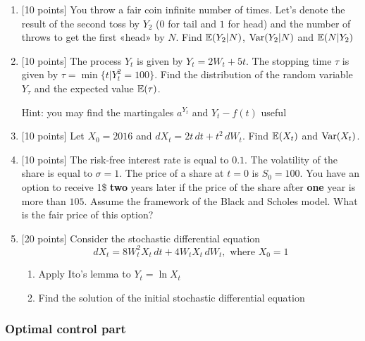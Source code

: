 \documentclass[12pt, a4paper]{article}
\begin{document}
\vspace{10pt}

\begin{enumerate}


\item $[$10 points] You throw a fair coin infinite number of times. Let's denote the result of the second toss by $Y_2$ ($0$ for tail and $1$ for head) and the number of throws to get the first «head» by $N$. Find $\mathbb{E}(Y_2|N)$, $\operatorname{Var}(Y_2|N)$ and $\mathbb{E}(N|Y_2)$

\item $[$10 points] The process $Y_t$ is given by $Y_t=2W_t+5t$. The stopping time $\tau$ is given by $\tau=\min\{t|Y_t^2=100\}$. Find the distribution of the random variable $Y_\tau$ and the expected value $\mathbb{E}(\tau)$.


Hint: you may find the martingales $a^{Y_t}$ and $Y_t-f(t)$ useful

\item $[$10 points] Let $X_0 = 2016$ and $dX_t = 2t \, dt + t^2 \, dW_t$. Find $\mathbb{E}(X_t)$ and $\operatorname{Var}(X_t)$.

\item $[$10 points] The risk-free interest rate is equal to $0.1$. The volatility of the share is equal to $\sigma=1$. The price of a share at $t=0$ is $S_0=100$. You have an option to receive 1\$ \textbf{two} years later if the price of the share after \textbf{one} year is more than $105$. Assume the framework of the Black and Scholes model. What is the fair price of this option?

\item $[$20 points] Consider the stochastic differential equation
\[
dX_t = 8W^2_t X_t \, dt + 4W_t X_t\, dW_t, \text{ where } X_0 = 1
\]

\begin{enumerate}
\item Apply Ito's lemma to $Y_t=\ln X_t$
\item Find the solution of the initial stochastic differential equation
\end{enumerate}

\end{enumerate}


\subsubsection*{Optimal control part}
\end{document}
